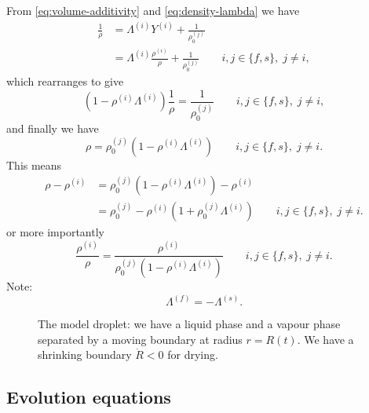 \documentclass[11pt,twoside]{report}
\begin{document}
From \eqref{eq:volume-additivity} and \eqref{eq:density-lambda} we have
\begin{equation*}
  \begin{aligned}
    \frac{1}{\rho} &=
    \Lambda^{(i)} Y^{(i)} + \frac{1}{\rho^{(j)}_0} \\
    &=
    \Lambda^{(i)} \frac{\rho^{(i)}}{\rho} + \frac{1}{\rho^{(j)}_0}
    \qquad i,j \in \{f,s\}, \; j \ne i,
  \end{aligned}
\end{equation*}
which rearranges to give
\begin{equation*}
  (1 - \rho^{(i)} \Lambda^{(i)})
  \frac{1}{\rho} =
  \frac{1}{\rho^{(j)}_0}
  \qquad i,j \in \{f,s\}, \; j \ne i,
\end{equation*}
and finally we have
\begin{equation}
  \rho =
  \rho^{(j)}_0 (1 - \rho^{(i)} \Lambda^{(i)})
  \qquad i,j \in \{f,s\}, \; j \ne i.
\end{equation}
This means
\begin{equation}
  \begin{aligned}
    \rho - \rho^{(i)} &=
    \rho^{(j)}_0 (1 - \rho^{(i)} \Lambda^{(i)}) - \rho^{(i)} \\
    &=
    \rho^{(j)}_0 - \rho^{(i)}(1 + \rho^{(j)}_0 \Lambda^{(i)})
    \qquad i,j \in \{f,s\}, \; j \ne i.
  \end{aligned}
\end{equation}
or more importantly
\begin{equation}
  \frac{\rho^{(i)}}{\rho} =
  \frac{\rho^{(i)}}{\rho^{(j)}_0 (1 - \rho^{(i)} \Lambda^{(i)})}
  \qquad i,j \in \{f,s\}, \; j \ne i.
\end{equation}
Note:
\begin{equation*}
  \Lambda^{(f)} = -\Lambda^{(s)}.
\end{equation*}

\begin{figure}
  \missingfigure[figwidth=\linewidth]{}
  \caption{The model droplet: we have a liquid phase and a vapour phase separated by a moving boundary at radius $r=R(t)$.
  We have a shrinking boundary $\dot{R} < 0$ for drying.}
\end{figure}

\subsection{Evolution equations}
\end{document}
